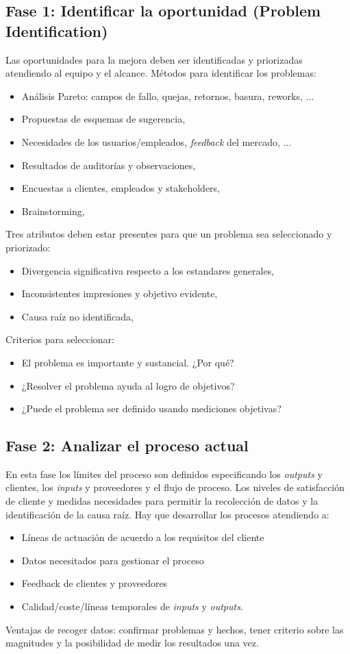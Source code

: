 \documentclass[]{article}
\begin{document}
\subsection{Fase 1: Identificar la oportunidad (Problem Identification)}
Las oportunidades para la mejora deben ser identificadas y priorizadas atendiendo al equipo y el alcance. Métodos para identificar los problemas: 
\begin{itemize}
	\item Análisis Pareto: campos de fallo, quejas, retornos, basura, reworks, ...
	\item Propuestas de esquemas de sugerencia, 
	\item Necesidades de los usuarios/empleados, \textit{feedback} del mercado, ...
	\item Resultados de auditorías y observaciones,
	\item Encuestas a clientes, empleados y stakeholders,
	\item Brainstorming, 
\end{itemize}
Tres atributos deben estar presentes para que un problema sea seleccionado y priorizado:
\begin{itemize}
	\item Divergencia significativa respecto a los estandares generales,
	\item Inconsistentes impresiones y objetivo evidente,
	\item Causa raíz no identificada,
\end{itemize}
Criterios para seleccionar:
\begin{itemize}
	\item El problema es importante y sustancial. ¿Por qué?
	\item ¿Resolver el problema ayuda al logro de objetivos?
	\item ¿Puede el problema ser definido usando mediciones objetivas?
\end{itemize}

\subsection{Fase 2: Analizar el proceso actual}
En esta fase los límites del proceso son definidos especificando los \textit{outputs} y clientes, los \textit{inputs} y proveedores y el flujo de proceso. Los niveles de satisfacción de cliente y medidas necesidades para permitir la recolección de datos y la identificación de la causa raíz. Hay que desarrollar los procesos atendiendo a: 
\begin{itemize}
	\item Líneas de actuación de acuerdo a los requisitos del cliente
	\item Datos necesitados para gestionar el proceso
	\item Feedback de clientes y proveedores
	\item Calidad/coste/líneas temporales de \textit{inputs} y \textit{outputs}.
\end{itemize}
Ventajas de recoger datos: confirmar problemas y hechos, tener criterio sobre las magnitudes y la posibilidad de medir los resultados una vez.
\end{document}
